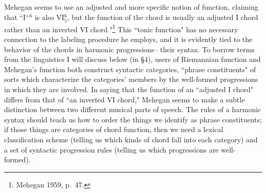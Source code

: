 Mehegan seems to use an adjusted and more specific notion of function, claiming that ``I$^{+6}$ is also VI$^{6}_5$, but the function of the chord is usually an adjusted I chord rather than an inverted VI chord."\footnote{Mehegan 1959, p.\ 47.}  This ``tonic function" has no necessary connection to the labeling procedure he employs, and it is evidently tied to the behavior of the chords in harmonic progressions-- their syntax.  To borrow terms from the linguistics I will discuss below (in \S 4), users of Riemannian function and Mehegan's function both construct syntactic categories, ``phrase constituents" of sorts which characterize the categories' members by the well-formed progressions in which they are involved.  In saying that the function of an ``adjusted I chord" differs from that of ``an inverted VI chord," Mehegan seems to make a subtle distinction between two different musical parts of speech.  The rules of a harmonic syntax should teach us how to order the things we identify as phrase constituents; if those things are categories of chord function, then we need a lexical classification scheme (telling us which kinds of chord fall into each category) and a set of syntactic progression rules (telling us which progressions are well-formed).

